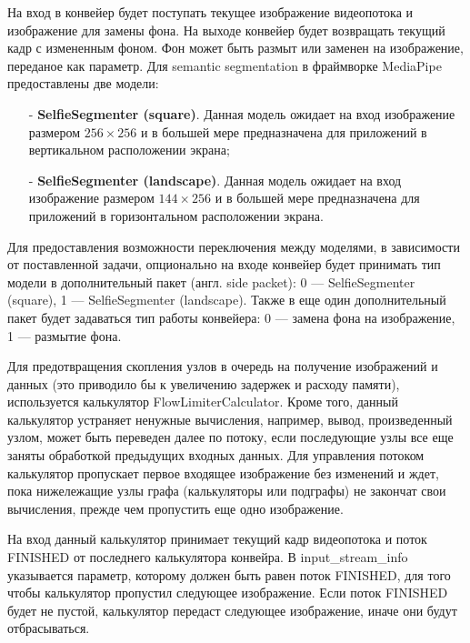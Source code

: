 \documentclass[a4paper,14pt]{extreport}
\begin{document}
        На вход в конвейер будет поступать текущее изображение видеопотока и изображение для замены фона. На выходе конвейер будет возвращать текущий кадр с измененным фоном. Фон может быть размыт или заменен на изображение, переданое как параметр. Для semantic segmentation в фраймворке MediaPipe предоставлены две модели:
        \begin{itemize}
          \item[-] \textbf{SelfieSegmenter (square)}. Данная модель ожидает на вход изображение размером $256 \times 256$ и в большей мере предназначена для приложений в вертикальном расположении экрана;
          
          \item[-] \textbf{SelfieSegmenter (landscape)}. Данная модель ожидает на вход изображение размером $144 \times 256$ и в большей мере предназначена для приложений в горизонтальном расположении экрана.
        \end{itemize}
        Для предоставления возможности переключения между моделями, в зависимости от поставленной задачи, опционально на входе конвейер будет принимать тип модели в дополнительный пакет (англ. side packet): 0 — SelfieSegmenter (square), 1 — SelfieSegmenter (landscape). Также в еще один дополнительный пакет будет задаваться тип работы конвейера: 0 — замена фона на изображение, 1 — размытие фона.
        

        Для предотвращения скопления узлов в очередь на получение изображений и данных (это приводило бы к увеличению задержек и расходу памяти), используется калькулятор FlowLimiterCalculator. Кроме того, данный калькулятор устраняет ненужные вычисления, например, вывод, произведенный узлом, может быть переведен далее по потоку, если последующие узлы все еще заняты обработкой предыдущих входных данных. Для управления потоком калькулятор пропускает первое входящее изображение без изменений и ждет, пока нижележащие узлы графа (калькуляторы или подграфы) не закончат свои вычисления, прежде чем пропустить еще одно изображение.

        На вход данный калькулятор принимает текущий кадр видеопотока и поток FINISHED от последнего калькулятора конвейра. В input\_stream\_info указывается параметр, которому должен быть равен поток FINISHED, для того чтобы калькулятор пропустил следующее изображение. Если поток FINISHED будет не пустой, калькулятор передаст следующее изображение, иначе они будут отбрасываться.
        
\end{document}
